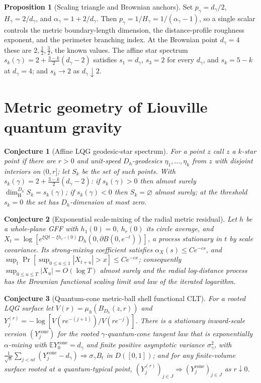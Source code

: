 \documentclass[11pt]{article}
\newtheorem{conjecture}{Conjecture}
\theoremstyle{definition}
\newtheorem{proposition}{Proposition}
\begin{document}
\begin{proposition}[Scaling triangle and Brownian anchors]\label{am:triangle}
Set \(p_\gamma=d_\gamma/2\), \(H_\gamma=2/d_\gamma\), and \(\alpha_\gamma=1+2/d_\gamma\).  Then \(p_\gamma=1/H_\gamma=1/(\alpha_\gamma-1)\), so a single scalar controls the metric boundary-length dimension, the distance-profile roughness exponent, and the perimeter branching index.  At the Brownian point \(d_\gamma=4\) these are \(2,\tfrac12,\tfrac32\), the known values.  The affine star spectrum \(s_k(\gamma)=2+\tfrac{3-k}2(d_\gamma-2)\) satisfies \(s_1=d_\gamma\), \(s_3=2\) for every \(d_\gamma\), and \(s_k=5-k\) at \(d_\gamma=4\); and \(s_k\to2\) as \(d_\gamma\downarrow2\).
\end{proposition}

\section{Metric geometry of Liouville quantum gravity}

\begin{conjecture}[Affine LQG geodesic-star spectrum]\label{am1}
For a point \(z\) call \(z\) a \(k\)-star point if there are \(r>0\) and unit-speed \(D_h\)-geodesics \(\eta_1,\dots,\eta_k\) from \(z\) with disjoint interiors on \((0,r]\); let \(S_k\) be the set of such points.  With \(s_k(\gamma)=2+\tfrac{3-k}2(d_\gamma-2)\): if \(s_k(\gamma)>0\) then almost surely \(\dim_{\mathrm H}^{D_h}S_k=s_k(\gamma)\); if \(s_k(\gamma)<0\) then \(S_k=\varnothing\) almost surely; at the threshold \(s_k=0\) the set has \(D_h\)-dimension at most zero.
\end{conjecture}

\begin{conjecture}[Exponential scale-mixing of the radial metric residual]\label{am2}
Let \(h\) be a whole-plane GFF with \(h_1(0)=0\), \(h_r(0)\) its circle average, and \(X_t=\log[e^{\xi Qt-\xi h_{e^{-t}}(0)}D_h(0,\partial B(0,e^{-t}))]\), a process stationary in \(t\) by scale covariance.  Its strong-mixing coefficient satisfies \(\alpha_X(s)\le Ce^{-cs}\), and \(\sup_t\Pr[\sup_{0\le u\le1}|X_{t+u}|>x]\le Ce^{-cx}\); consequently \(\sup_{0\le u\le T}|X_u|=O(\log T)\) almost surely and the radial log-distance process has the Brownian functional scaling limit and law of the iterated logarithm.
\end{conjecture}

\begin{conjecture}[Quantum-cone metric-ball shell functional CLT]\label{am3}
For a rooted LQG surface let \(V(r)=\mu_h(B_{D_h}(z,r))\) and \(Y_j^{(r)}=-\log[V(re^{-(j+1)})/V(re^{-j})]\).  There is a stationary inward-scale version \((Y_j^{\mathrm{cone}})\) for the rooted \(\gamma\)-quantum-cone tangent law that is exponentially \(\alpha\)-mixing with \(\mathbb E Y_0^{\mathrm{cone}}=d_\gamma\) and finite positive asymptotic variance \(\sigma_\gamma^2\), with \(\tfrac1{\sqrt n}\sum_{j<nt}(Y_j^{\mathrm{cone}}-d_\gamma)\Rightarrow\sigma_\gamma B_t\) in \(D([0,1])\); and for any finite-volume surface rooted at a quantum-typical point, \((Y_j^{(r)})_{j\in J}\Rightarrow(Y_j^{\mathrm{cone}})_{j\in J}\) as \(r\downarrow0\).
\end{conjecture}
\end{document}
